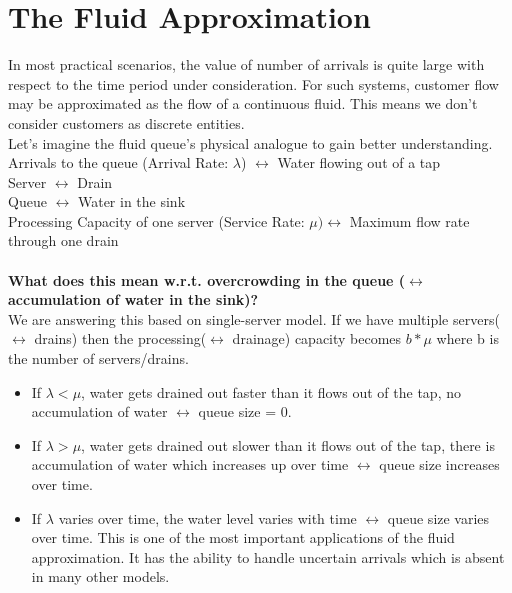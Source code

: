 \section{The Fluid Approximation}
In most practical scenarios, the value of number of arrivals is quite large with respect to the time period under consideration. For such systems, customer flow may be approximated as the flow of a continuous fluid. This means we don't consider customers as discrete entities. \\
Let's imagine the fluid queue's physical analogue to gain better understanding. \\
Arrivals to the queue (Arrival Rate: $\lambda$) $\leftrightarrow$ Water flowing out of a tap \\
Server $\leftrightarrow$ Drain \\
Queue $\leftrightarrow$ Water in the sink \\
Processing Capacity of one server (Service Rate: $\mu) \leftrightarrow$ Maximum flow rate through one drain\\ \\
\textbf{What does this mean w.r.t. overcrowding in the queue ($\leftrightarrow$ accumulation of water in the sink)?} \\
We are answering this based on single-server model. If we have multiple servers($\leftrightarrow$ drains) then the processing($\leftrightarrow$ drainage) capacity becomes $b*\mu$ where b is the number of servers/drains.\\
\begin{itemize}
\itemsep1em
  \item If $\lambda<\mu$, water gets drained out faster than it flows out of the tap, no accumulation of water $\leftrightarrow$ queue size = 0.
  \item If $\lambda>\mu$, water gets drained out slower than it flows out of the tap, there is accumulation of water which increases up over time $\leftrightarrow$ queue size increases over time.
  \item If $\lambda$ varies over time, the water level varies with time $\leftrightarrow$ queue size varies over time. This is one of the most important applications of the fluid approximation. It has the ability to handle uncertain arrivals which is absent in many other models.
 \end{itemize}
